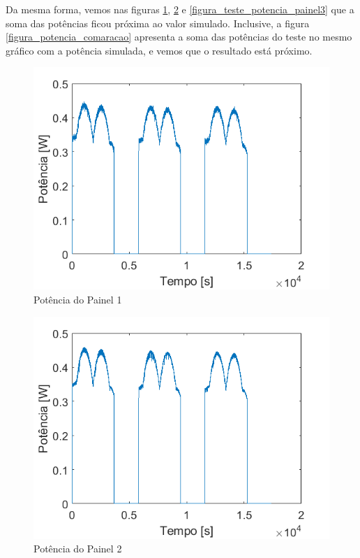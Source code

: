 Da mesma forma, vemos nas figuras \ref{figura_teste_potencia_painel1}, \ref{figura_teste_potencia_painel2} e \ref{figura_teste_potencia_painel3} que a soma das potências ficou próxima ao valor simulado. Inclusive, a figura \ref{figura_potencia_comaracao} apresenta a soma das potências do teste no mesmo gráfico com a potência simulada, e vemos que o resultado está próximo.

\begin{figure}[!htpb]
\begin{center}
\includegraphics[scale=0.5]{figures/testPanel1Power.png}
\caption{Potência do Painel 1}
\label{figura_teste_potencia_painel1}
\end{center}
\end{figure}

\begin{figure}[!htpb]
\begin{center}
\includegraphics[scale=0.5]{figures/testPanel2Power.png}
\caption{Potência do Painel 2}
\label{figura_teste_potencia_painel2}
\end{center}
\end{figure}

